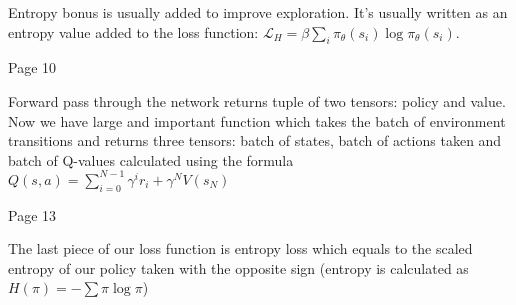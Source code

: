 Entropy bonus is usually added to improve exploration. It’s usually written as
an entropy value added to the loss function: \begin{math}\mathcal{L}_H = \beta
  \sum_i \pi_\theta(s_i) \log \pi_\theta(s_i)\end{math}.


Page 10


Forward pass through the network returns tuple of two tensors: policy and
value. Now we have large and important function which takes the batch of
environment transitions and returns three tensors: batch of states, batch of
actions taken and batch of Q-values calculated using the
formula \begin{math}Q(s, a) = \sum_{i=0}^{N-1}\gamma^ir_i + \gamma^NV(s_N)\end{math}


Page 13

The last piece of our loss function is entropy loss which equals to the scaled
entropy of our policy taken with the opposite sign (entropy is calculated
as \begin{math}H(\pi) = -\sum \pi \log \pi\end{math})

